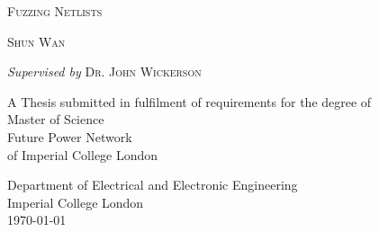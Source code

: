 \thispagestyle{empty}

\begin{center}
\null {}
\renewcommand{\baselinestretch}{2}

\textsc{\huge{Fuzzing Netlists}}



\textsc{\large{Shun Wan}} \\


\textit{Supervised by}
\textsc{\large{Dr. John Wickerson}}\\

A Thesis submitted in fulfilment of requirements for the degree of \\
Master of Science\\
Future Power Network\\
of Imperial College London




Department of Electrical and Electronic Engineering\\
Imperial College London\\
\today

\end{center}


